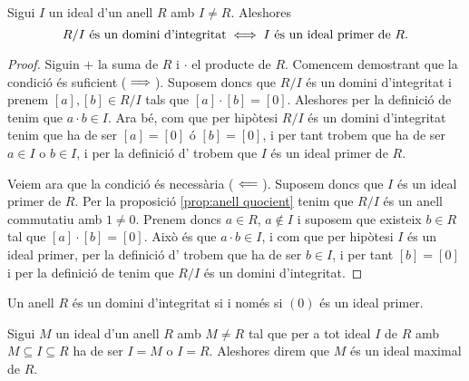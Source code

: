 \documentclass[../Apunts.tex]{subfiles}
\begin{document}
	\begin{proposition}
		\label{prop:R/I domini d'integritat sii I ideal primer}
		Sigui \(I\) un ideal d'un anell \(R\) amb \(I\neq R\). Aleshores
		\[R/I\text{ és un domini d'integritat}\iff I\text{ és un ideal primer de }R.\]
		\begin{proof} %
			Siguin \(+\) la suma de \(R\) i \(\cdot\) el producte de \(R\). Comencem demostrant que la condició és suficient (\(\implies\)). Suposem doncs que \(R/I\) és un domini d'integritat i prenem \([a],[b]\in R/I\) tals que \([a]\cdot[b]=[0]\). Aleshores per la definició de  tenim que \(a\cdot b\in I\). Ara bé, com que per hipòtesi \(R/I\) és un domini d'integritat tenim que ha de ser \([a]=[0]\) ó \([b]=[0]\), i per tant trobem que ha de ser \(a\in I\) o \(b\in I\), i per la definició d' trobem que \(I\) és un ideal primer de \(R\).
			
			Veiem ara que la condició és necessària (\(\impliedby\)). Suposem doncs que \(I\) és un ideal primer de \(R\). Per la proposició \ref{prop:anell quocient} tenim que \(R/I\) és un anell commutatiu amb \(1\neq0\). Prenem doncs \(a\in R\), \(a\notin I\) i suposem que existeix \(b\in R\) tal que \([a]\cdot[b]=[0]\). Això és que \(a\cdot b\in I\), i com que per hipòtesi \(I\) és un ideal primer, per la definició d' trobem que ha de ser \(b\in I\), i per tant \([b]=[0]\) i per la definició de  tenim que \(R/I\) és un domini d'integritat.
		\end{proof}
	\end{proposition}
	\begin{corollary}
		\label{corollary:domini d'integritat sii (0) ideal primer}
		Un anell \(R\) és un domini d'integritat si i només si \((0)\) és un ideal primer.
	\end{corollary}
	\begin{definition}
		\label{def:ideal maximal}
		Sigui \(M\) un ideal d'un anell \(R\) amb \(M\neq R\) tal que  per a tot ideal \(I\) de \(R\) amb \(M\subseteq I\subseteq R\) ha de ser \(I=M\) o \(I=R\). Aleshores direm que \(M\) és un ideal maximal de \(R\).
	\end{definition}
\end{document}
